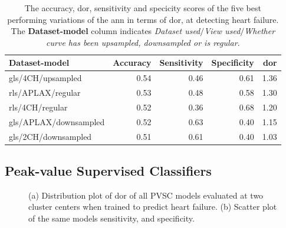 \begin{table}
    \centering
    \begin{tabular}{lrrrr}
        \toprule
        Dataset-model         &  Accuracy &  Sensitivity &  Specificity &  \acrshort{dor} \\
        \midrule
        gls/4CH/upsampled     &      0.54 &         0.46 &         0.61 & 1.36 \\
        rls/APLAX/regular     &      0.53 &         0.48 &         0.58 & 1.30 \\
        rls/4CH/regular       &      0.52 &         0.36 &         0.68 & 1.20 \\
        gls/APLAX/downsampled &      0.52 &         0.63 &         0.40 & 1.15 \\
        gls/2CH/downsampled   &      0.51 &         0.61 &         0.40 & 1.03 \\
        \bottomrule
    \end{tabular}
    \caption{The accuracy, \acrshort{dor}, sensitivity and specicity scores of the five best performing variations of the \acrshort{ann} in terms of \acrshort{dor}, at detecting heart failure.
             The \textbf{Dataset-model} column indicates \textit{Dataset used}$/$\textit{View used}$/$\textit{Whether curve has been upsampled, downsampled or is regular}.}
    \label{tab:dl_hf_dor_sens_spec_dist}
\end{table}
\newpage

\subsection{Peak-value Supervised Classifiers}

\begin{figure}[htb]
    \centering
    
    \caption{(a) Distribution plot of \acrshort{dor} of all PVSC models evaluated at two cluster centers when trained to predict heart failure.
             (b) Scatter plot of the same models sensitivity, and specificity.}
    \label{fig:pvmlc_hf_dor_sens_spec_dis}
\end{figure}

